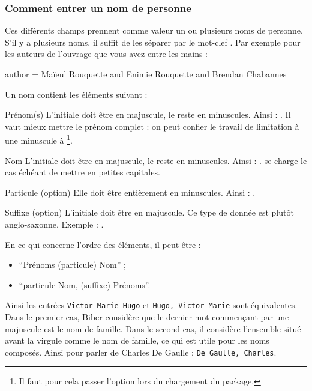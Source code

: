 \subsubsection{Comment entrer un nom de personne}

Ces différents champs prennent comme valeur un ou plusieurs noms de personne. S'il y a plusieurs noms, il suffit de les séparer par le mot-clef . Par exemple pour les auteurs de l'ouvrage que vous avez entre les mains : 

\begin{latexcode}
author = {Maïeul Rouquette and Enimie Rouquette and Brendan Chabannes}
\end{latexcode}

Un nom contient les éléments suivant :
\begin{choix}
	\item[Prénom(s)]L'initiale doit être en majuscule, le reste en minuscules. Ainsi : . Il vaut mieux mettre le prénom complet : on peut confier le travail de limitation à une minuscule  à \footnote{Il faut pour cela passer l'option  lors du chargement du package.}.
	\item[Nom]L'initiale doit être en majuscule, le reste en minuscules. Ainsi : .  se charge le cas échéant de mettre en petites capitales.
	\item[Particule (option)]Elle doit être entièrement en minuscules. Ainsi : .
	\item[Suffixe (option)]L'initiale doit être en majuscule. Ce type de donnée est plutôt anglo-saxonne. Exemple : .
\end{choix}


En ce qui concerne l'ordre des éléments, il  peut être :
\begin{itemize}
\item\enquote{Prénoms  (particule)  Nom} ;
\item\enquote{particule Nom, (suffixe) Prénoms}.
\end{itemize}

Ainsi les entrées \verb|Victor Marie Hugo| et \verb|Hugo, Victor Marie| sont équivalentes.
Dans le premier cas, Biber considère que le dernier mot commençant par une majuscule est le nom de famille. Dans le second cas, il considère l'ensemble situé avant la virgule comme le nom de famille, ce qui est utile pour les noms composés. Ainsi pour parler de Charles De Gaulle : \verb|De Gaulle, Charles|.

